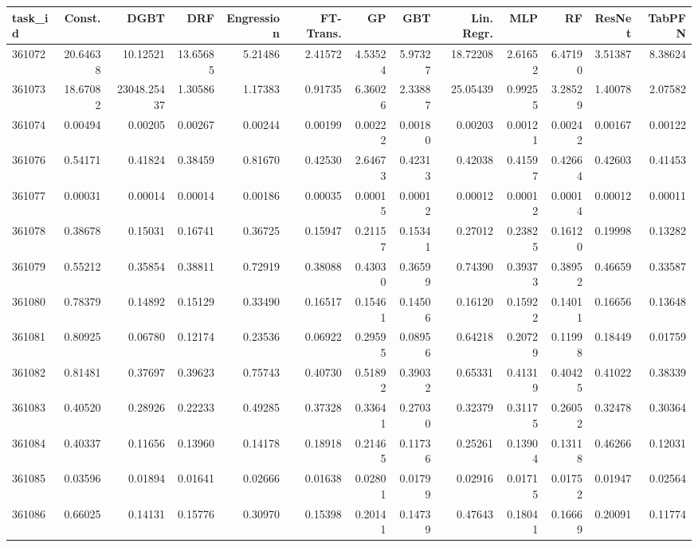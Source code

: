 \begin{tabular}{lrrrrrrrrrrrr}
\toprule
task\_id & Const. & DGBT & DRF & Engression & FT-Trans. & GP & GBT & Lin. Regr. & MLP & RF & ResNet & TabPFN \\
\midrule
361072 & 20.64638 & 10.12521 & 13.65685 & 5.21486 & 2.41572 & 4.53524 & 5.97327 & 18.72208 & 2.61652 & 6.47190 & 3.51387 & 8.38624 \\
361073 & 18.67082 & 23048.25437 & 1.30586 & 1.17383 & 0.91735 & 6.36026 & 2.33887 & 25.05439 & 0.99255 & 3.28529 & 1.40078 & 2.07582 \\
361074 & 0.00494 & 0.00205 & 0.00267 & 0.00244 & 0.00199 & 0.00222 & 0.00180 & 0.00203 & 0.00121 & 0.00242 & 0.00167 & 0.00122 \\
361076 & 0.54171 & 0.41824 & 0.38459 & 0.81670 & 0.42530 & 2.64673 & 0.42313 & 0.42038 & 0.41597 & 0.42664 & 0.42603 & 0.41453 \\
361077 & 0.00031 & 0.00014 & 0.00014 & 0.00186 & 0.00035 & 0.00015 & 0.00012 & 0.00012 & 0.00012 & 0.00014 & 0.00012 & 0.00011 \\
361078 & 0.38678 & 0.15031 & 0.16741 & 0.36725 & 0.15947 & 0.21157 & 0.15341 & 0.27012 & 0.23825 & 0.16120 & 0.19998 & 0.13282 \\
361079 & 0.55212 & 0.35854 & 0.38811 & 0.72919 & 0.38088 & 0.43030 & 0.36599 & 0.74390 & 0.39373 & 0.38952 & 0.46659 & 0.33587 \\
361080 & 0.78379 & 0.14892 & 0.15129 & 0.33490 & 0.16517 & 0.15461 & 0.14506 & 0.16120 & 0.15922 & 0.14011 & 0.16656 & 0.13648 \\
361081 & 0.80925 & 0.06780 & 0.12174 & 0.23536 & 0.06922 & 0.29595 & 0.08956 & 0.64218 & 0.20729 & 0.11998 & 0.18449 & 0.01759 \\
361082 & 0.81481 & 0.37697 & 0.39623 & 0.75743 & 0.40730 & 0.51892 & 0.39032 & 0.65331 & 0.41319 & 0.40425 & 0.41022 & 0.38339 \\
361083 & 0.40520 & 0.28926 & 0.22233 & 0.49285 & 0.37328 & 0.33641 & 0.27030 & 0.32379 & 0.31175 & 0.26052 & 0.32478 & 0.30364 \\
361084 & 0.40337 & 0.11656 & 0.13960 & 0.14178 & 0.18918 & 0.21465 & 0.11736 & 0.25261 & 0.13904 & 0.13118 & 0.46266 & 0.12031 \\
361085 & 0.03596 & 0.01894 & 0.01641 & 0.02666 & 0.01638 & 0.02801 & 0.01799 & 0.02916 & 0.01715 & 0.01752 & 0.01947 & 0.02564 \\
361086 & 0.66025 & 0.14131 & 0.15776 & 0.30970 & 0.15398 & 0.20141 & 0.14739 & 0.47643 & 0.18041 & 0.16669 & 0.20091 & 0.11774 \\

\end{tabular}
